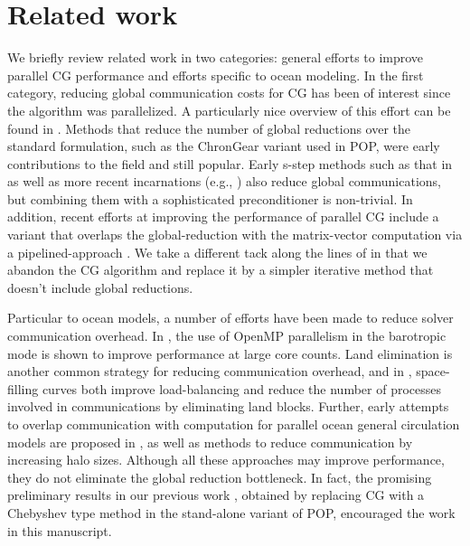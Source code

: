 \section{Related work} \label{se:rel}

We briefly review related work in two categories: general efforts to improve parallel CG performance and efforts specific to ocean modeling. 
In the first category, reducing global communication costs for CG has been of interest since the algorithm was parallelized.
A particularly nice overview of this effort can be found in \cite{ghysels2014}.   Methods that reduce the number of global reductions over the standard formulation, such as the ChronGear \cite{dAzevedo1999lapack} variant used in POP, were early contributions to the field and still popular.  Early s-step methods such as that in \cite{chron1989} as well as more recent incarnations (e.g.,  \cite{hoemmen2010}) also reduce global communications, but combining them with a sophisticated preconditioner is non-trivial. In addition, recent efforts at improving the performance of parallel CG include a variant that overlaps the global-reduction with the matrix-vector computation via a pipelined-approach \cite{ghysels2014}. 
We take a different tack along the lines of \cite {gutknecht2002chebyshev} in that we abandon the CG algorithm and replace it by a simpler iterative method that doesn't include global reductions.

Particular to ocean models, a number of efforts have been made to reduce solver communication overhead. In \cite{Worley:2011:PCE:2063384.2063457}, the use of OpenMP parallelism in the barotropic mode is shown to improve performance at large core counts.
Land elimination is another common strategy for reducing communication overhead, and in
\cite{dennis2007inverse,dennis2008scaling}, space-filling curves both improve load-balancing and reduce the number of processes involved in communications by eliminating land blocks.
Further, early attempts to overlap communication with computation 
for parallel ocean general circulation models are proposed in \cite{beare1997optimisation}, as well as 
methods to reduce communication by increasing halo sizes. Although all these approaches may improve performance, they do not eliminate the global reduction bottleneck. 
In fact, the promising preliminary results in our previous work \cite{hu2013scalable}, obtained by replacing CG with a Chebyshev type method in the stand-alone variant of POP, encouraged the work in this manuscript.

